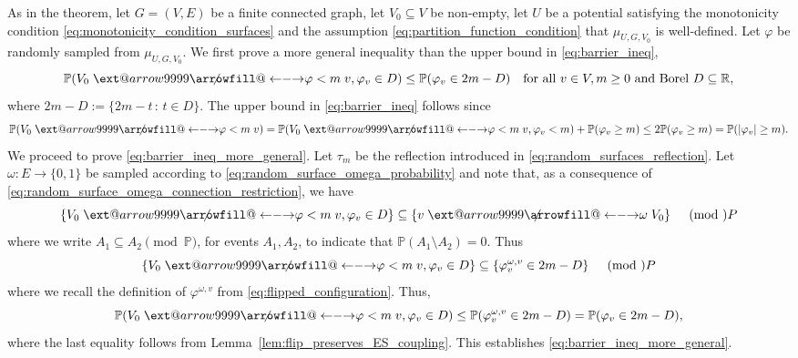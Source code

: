 \documentclass[english]{article}
\makeatletter
\renewcommand{\P}{\mathbb{P}}
\newcommand\xleftrightarrow[2][]{%
  \ext@arrow 9999{\longleftrightarrowfill@}{#1}{#2}}
\newcommand\longleftrightarrowfill@{%
  \arrowfill@\leftarrow\relbar\rightarrow}
\theoremstyle{plain}
\theoremstyle{plain}
\makeatother
\begin{document}
As in the theorem, let $G=(V,E)$ be a finite connected graph, let $V_0\subseteq V$ be
non-empty, let $U$ be a potential satisfying the monotonicity
condition \eqref{eq:monotonicity_condition_surfaces} and the
assumption \eqref{eq:partition_function_condition} that
$\mu_{U,G,V_0}$ is well-defined. Let $\varphi$ be randomly sampled
from $\mu_{U,G,V_{0}}$. We first prove a more general inequality than the upper bound in \eqref{eq:barrier_ineq},
\begin{equation}\label{eq:barrier_ineq_more_general}
  \mathbb{P}(V_0\centernot{\xleftrightarrow{\varphi< m}} v, \varphi_v\in D)\le
\mathbb{P}(\varphi_v\in 2m-D)\quad \text{for all $v\in V,
  m\ge 0$ and Borel $D\subseteq\mathbb{R}$},
\end{equation}
where $2m-D:=\{2m-t\,\colon\,t\in D\}$. The upper bound in \eqref{eq:barrier_ineq} follows since
\begin{equation*}
  \mathbb{P}(V_0\centernot{\xleftrightarrow{\varphi< m}} v) = \mathbb{P}(V_0\centernot{\xleftrightarrow{\varphi< m}} v, \varphi_v<m) +
  \mathbb{P}(\varphi_v\ge m) \le 2\mathbb{P}(\varphi_v\ge m) = \mathbb{P}(|\varphi_v|\ge m).
\end{equation*}
We proceed to prove \eqref{eq:barrier_ineq_more_general}. Let $\tau_m$ be the reflection introduced in \eqref{eq:random_surfaces_reflection}. Let
$\omega:E\to\{0,1\}$ be sampled according to \eqref{eq:random_surface_omega_probability} and note that, as a consequence of
\eqref{eq:random_surface_omega_connection_restriction}, we have
\begin{equation*}
  \{V_0\centernot{\xleftrightarrow{\varphi< m}} v, \varphi_v\in D\}\subseteq\{v\centernot{\xleftrightarrow{\omega}}V_0\}\quad\pmod\P
\end{equation*}
where we write $A_1\subseteq A_2\pmod\P$, for events $A_1,A_2$, to indicate that $\P(A_1\setminus A_2)=0$. Thus
\begin{equation*}
  \{V_0\centernot{\xleftrightarrow{\varphi< m}} v, \varphi_v\in D\}\subseteq\{\varphi^{\omega,v}_v \in 2m-D\}\quad\pmod\P
\end{equation*}
where we recall the definition of $\varphi^{\omega, v}$ from \eqref{eq:flipped_configuration}. Thus,
\begin{equation*}
  \P(V_0\centernot{\xleftrightarrow{\varphi< m}} v, \varphi_v\in D)\le \P(\varphi^{\omega,v}_v \in 2m-D) = \P(\varphi_v\in 2m-D),
\end{equation*}
where the last equality follows from Lemma~\ref{lem:flip_preserves_ES_coupling}. This establishes \eqref{eq:barrier_ineq_more_general}.
\end{document}
